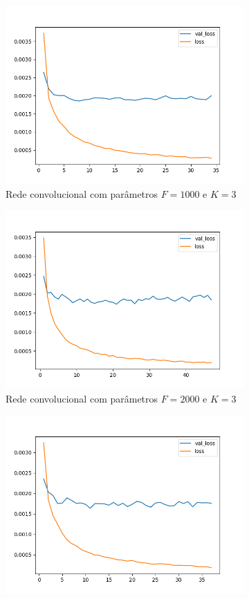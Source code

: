 \begin{figure}[H]
\begin{subfigure}{.5\textwidth}
  \centering
  \includegraphics[width=.8\linewidth]{figuras/ape-ajustes-hiper-parametros/cnn-1000-k-3.png}
  \caption{Rede convolucional com parâmetros $F = 1000$ e $K = 3$}
  \label{fig:cnn-1000-k-3}
\end{subfigure}
\begin{subfigure}{.5\textwidth}
  \centering
  \includegraphics[width=.8\linewidth]{figuras/ape-ajustes-hiper-parametros/cnn-2000-k-3.png}
  \caption{Rede convolucional com parâmetros $F = 2000$ e $K = 3$}
  \label{fig:cnn-2000-k-3}
\end{subfigure}
\begin{subfigure}{.5\textwidth}
  \centering
  \includegraphics[width=.8\linewidth]{figuras/ape-ajustes-hiper-parametros/cnn-4000-k-3.png}

\end{subfigure}
\end{figure}
